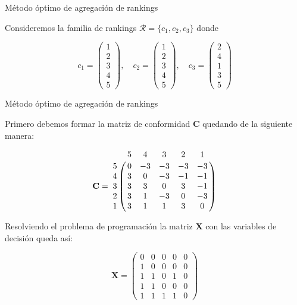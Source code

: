 \documentclass[10pt,hyperref={unicode}]{beamer}
\begin{document}
	\begin{frame}{Método óptimo de agregación de rankings}
		\begin{ejemplo}
			Consideremos la familia de rankings $\mathcal{R} = \{c_1, c_2, c_3\}$ donde
			
			\begin{equation*}
			c_1 = \left( \begin{array}{c}
			1\\
			2\\
			3\\
			4\\
			5
			\end{array} \right), \quad
			c_2 = \left( \begin{array}{c}
			1\\
			2\\
			3\\
			4\\
			5
			\end{array} \right), \quad
			c_3 = \left( \begin{array}{c}
			2\\
			4\\
			1\\
			3\\
			5
			\end{array} \right)
			\end{equation*}
			
		\end{ejemplo}
	\end{frame}
	
	\begin{frame}{Método óptimo de agregación de rankings}
		\begin{ejemplo}[continuación]
			Primero debemos formar la matriz de conformidad $\mathbf{C}$ quedando de la siguiente manera:
					
			\begin{equation*}
			\mathbf{C} = \bordermatrix{
			  & 5 & 4 & 3 & 2 & 1 \cr
			5 & 0 & -3 & -3 & -3 & -3 \cr
			4 & 3 &  0 & -3 & -1 & -1 \cr
			3 & 3 &  3 &  0 &  3 & -1 \cr
			2 & 3 &  1 & -3 &  0 & -3 \cr
			1 & 3 &  1 &  1	&  3 &	0 \cr
			}
			\end{equation*}
			
			Resolviendo el problema de programación la matriz $\mathbf{X}$ con las variables de decisión queda así:
			
			\begin{equation*}
			\mathbf{X} = \left(\begin{array}{rrrrr}
			0 & 0 & 0 & 0 & 0 \\
			1 & 0 & 0 & 0 & 0 \\
			1 & 1 & 0 & 1 & 0 \\
			1 & 1 & 0 & 0 & 0 \\
			1 & 1 & 1 & 1 &	0
			\end{array}\right)
			\end{equation*}
			
			
		\end{ejemplo}
	\end{frame}
	
\end{document}
